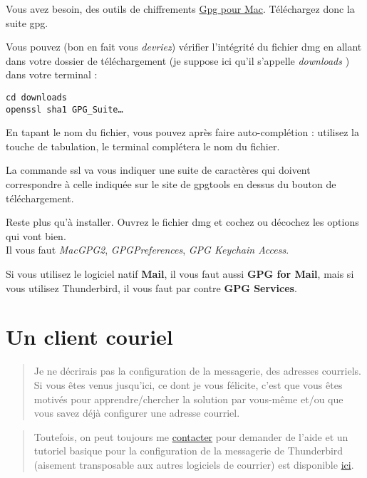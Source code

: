 Vous avez besoin, des outils de chiffrements
\href{https://gpgtools.org/}{Gpg pour Mac}. Téléchargez donc la suite
gpg.

Vous pouvez (bon en fait vous \emph{devriez}) vérifier l'intégrité du
fichier dmg en allant dans votre dossier de téléchargement (je suppose
ici qu'il s'appelle \emph{downloads} ) dans votre terminal :

\begin{verbatim}
cd downloads
openssl sha1 GPG_Suite…
\end{verbatim}

En tapant le nom du fichier, vous pouvez après faire auto-complétion :
utilisez la touche de tabulation, le terminal complétera le nom du
fichier.

La commande ssl va vous indiquer une suite de caractères qui doivent
correspondre à celle indiquée sur le site de gpgtools en dessus du
bouton de téléchargement.

Reste plus qu'à installer. Ouvrez le fichier dmg et cochez ou décochez
les options qui vont bien.\\Il vous faut \emph{MacGPG2},
\emph{GPGPreferences}, \emph{GPG Keychain Access}.

Si vous utilisez le logiciel natif \textbf{Mail}, il vous faut aussi
\textbf{GPG for Mail}, mais si vous utilisez Thunderbird, il vous faut
par contre \textbf{GPG Services}.

\section{Un client couriel}\label{un-client-couriel}

\begin{quote}
Je ne décrirais pas la configuration de la messagerie, des adresses
courriels.\\Si vous êtes venus jusqu'ici, ce dont je vous félicite,
c'est que vous êtes motivés pour apprendre/chercher la solution par
vous-même et/ou que vous savez déjà configurer une adresse courriel.
\end{quote}

\begin{quote}
Toutefois, on peut toujours me
\href{\{filename\}../pages/contact-fr.md}{contacter} pour demander de
l'aide et un tutoriel basique pour la configuration de la messagerie de
Thunderbird (aisement transposable aux autres logiciels de courrier) est
disponible
\href{http://www.astucesinternet.com/modules/news/article.php?storyid=180}{ici}.
\end{quote}

